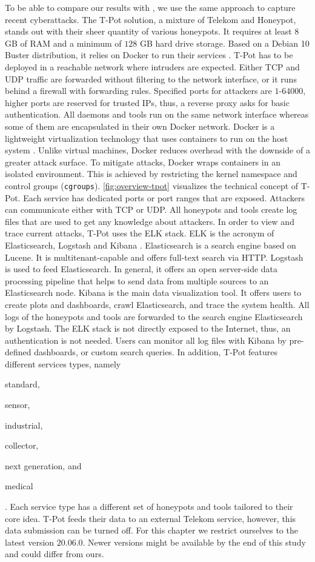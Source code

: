 To be able to compare our results with \citet{Kelly2021}, we use the same approach to capture recent cyberattacks.
The T-Pot solution, a mixture of Telekom and Honeypot, stands out with their sheer quantity of various honeypots.
It requires at least $8$ GB of RAM and a minimum of $128$ GB hard drive storage.
Based on a Debian 10 Buster distribution, it relies on Docker to run their services \cite{docker2021}.
T-Pot has to be deployed in a reachable network where intruders are expected.
Either TCP and UDP traffic are forwarded without filtering to the network interface, or it runs behind a firewall with forwarding rules.
Specified ports for attackers are $1$-$64000$, higher ports are reserved for trusted IPs, thus, a reverse proxy asks for basic authentication.
All daemons and tools run on the same network interface whereas some of them are encapsulated in their own Docker network.
Docker is a lightweight virtualization technology that uses containers to run on the host system \cite{combe2016}.
Unlike virtual machines, Docker reduces overhead with the downside of a greater attack surface.
To mitigate attacks, Docker wraps containers in an isolated environment.
This is achieved by restricting the kernel namespace and control groups (\verb|cgroups|).
\autoref{fig:overview-tpot} visualizes the technical concept of T-Pot.
Each service has dedicated ports or port ranges that are exposed.
Attackers can communicate either with TCP or UDP.
All honeypots and tools create log files that are used to get any knowledge about attackers.
In order to view and trace current attacks, T-Pot uses the ELK stack.
ELK is the acronym of Elasticsearch, Logstash and Kibana \cite{elastic2021}.
Elasticsearch is a search engine based on Lucene.
It is multitenant-capable and offers full-text search via HTTP.
Logstash is used to feed Elasticsearch.
In general, it offers an open server-side data processing pipeline that helps to send data from multiple sources to an Elasticsearch node.
Kibana is the main data visualization tool.
It offers users to create plots and dashboards, crawl Elasticsearch, and trace the system health.
All logs of the honeypots and tools are forwarded to the search engine Elasticsearch by Logstash.
The ELK stack is not directly exposed to the Internet, thus, an authentication is not needed.
Users can monitor all log files with Kibana by pre-defined dashboards, or custom search queries.
In addition, T-Pot features different services types, namely
\begin{enumerate*}[label=(\roman*)]
    \item standard,
    \item sensor,
    \item industrial,
    \item collector,
    \item next generation, and
    \item medical
\end{enumerate*}.
Each service type has a different set of honeypots and tools tailored to their core idea.
T-Pot feeds their data to an external Telekom service, however, this data submission can be turned off.
For this chapter we restrict ourselves to the latest version $20.06.0$.
Newer versions might be available by the end of this study and could differ from ours.


